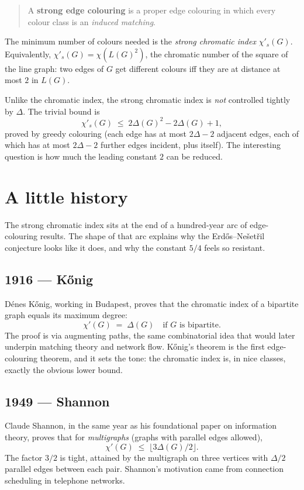 \documentclass[11pt]{article}
\newcommand{\sci}{\chi'_s}
\begin{document}
\begin{quote}
  A \textbf{strong edge colouring} is a proper edge colouring in which
  every colour class is an \emph{induced matching}.
\end{quote}

The minimum number of colours needed is the \emph{strong chromatic
index} $\sci(G)$. Equivalently, $\sci(G) = \chi(L(G)^2)$, the
chromatic number of the square of the line graph: two edges of $G$
get different colours iff they are at distance at most $2$ in $L(G)$.

Unlike the chromatic index, the strong chromatic index is \emph{not}
controlled tightly by $\Delta$. The trivial bound is
\[
\sci(G) \;\leq\; 2\Delta(G)^2 - 2\Delta(G) + 1 ,
\]
proved by greedy colouring (each edge has at most $2\Delta-2$
adjacent edges, each of which has at most $2\Delta-2$ further
edges incident, plus itself). The interesting question is how much
the leading constant $2$ can be reduced.

\section*{A little history}

The strong chromatic index sits at the end of a hundred-year arc of
edge-colouring results. The shape of that arc explains why the
Erd\H{o}s--Ne\v{s}et\v{r}il conjecture looks like it does, and why
the constant $5/4$ feels so resistant.

\subsection*{1916 --- K\H{o}nig}

D\'enes K\H{o}nig, working in Budapest, proves that the chromatic index
of a bipartite graph equals its maximum degree:
\[
\chi'(G) \;=\; \Delta(G) \quad \text{if } G \text{ is bipartite.}
\]
The proof is via augmenting paths, the same combinatorial idea that
would later underpin matching theory and network flow. K\H{o}nig's
theorem is the first edge-colouring theorem, and it sets the tone:
the chromatic index is, in nice classes, exactly the obvious lower
bound.

\subsection*{1949 --- Shannon}

Claude Shannon, in the same year as his foundational paper on
information theory, proves that for \emph{multigraphs} (graphs with
parallel edges allowed),
\[
\chi'(G) \;\leq\; \lfloor 3\Delta(G)/2 \rfloor.
\]
The factor $3/2$ is tight, attained by the multigraph on three
vertices with $\Delta/2$ parallel edges between each pair. Shannon's
motivation came from connection scheduling in telephone networks.
\end{document}
